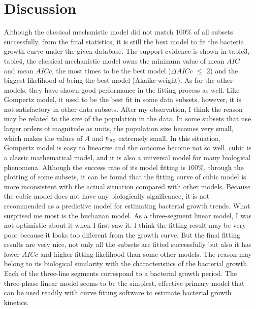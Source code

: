 \documentclass[11pt]{article}
\begin{document}
\section{Discussion}
Although the classical mechanistic model did not match $100\%$ of all subsets successfully, from the final statistics, it is still the best model to fit the bacteria growth curve under the given database. The support evidence is shown in table3, table4, the classical mechanistic model owns the minimum value of mean $AIC$ and mean $AICc$, the most times to be the best model ($\Delta$$AICc$ $\leq$ 2) and the biggest likelihood of being the best model (Akaike weight)\citep{sakamoto1986akaike}. As for the other models, they have shown good performance in the fitting process as well. Like Gompertz model, it used to be the best fit in some data subsets, however, it is not satisfactory in other data subsets. After my observation, I think the reason may be related to the size of the population in the data. In some subsets that use larger orders of magnitude as units, the population size becomes very small, which makes the values of $A$ and $t\textsubscript{lag}$ extremely small. In this situation, Gompertz model is easy to linearize and the outcome become not so well. cubic is a classic mathematical model, and it is also a universal model for many biological phenomena. Although the success rate of its model fitting is $100\%$, through the plotting of some subsets, it can be found that the fitting curve of cubic model is more inconsistent with the actual situation compared with other models. Because the cubic model does not have any biologically significance\citep{brunner2006matrix}, it is not recommended as a predictive model for estimating bacterial growth trends. What surprised me most is the buchanan model. As a three-segment linear model, I was not optimistic about it when I first saw it. I think the fitting result may be very poor because it looks too different from the growth curve. But the final fitting results are very nice, not only all the subsets are fitted successfully but also it has lower $AICc$ and higher fitting likelihood than some other models. The reason may belong to its biological similarity with the characteristics of the bacterial growth. Each of the three-line segments correspond to a bacterial growth period. The three-phase linear model seems to be the simplest, effective primary model that can be used readily with curve fitting software to estimate bacterial growth kinetics\citep{buchanan1997simple}.



    
\end{document}
